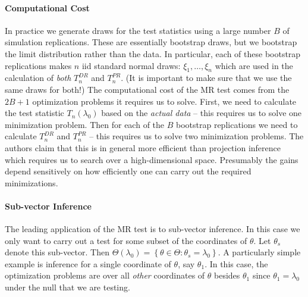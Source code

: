 \documentclass[12pt]{article}
\begin{document}
\paragraph{Computational Cost}
In practice we generate draws for the test statistics using a large number $B$ of simulation replications.
These are essentially bootstrap draws, but we bootstrap the limit distribution rather than the data.
In particular, each of these bootstrap replications makes $n$ iid standard normal draws: $\xi_1, \hdots, \xi_n$ which are used in the calculation of \emph{both} $T_n^{DR}$ and $T_n^{PR}$.
(It is important to make sure that we use the same draws for both!)
The computational cost of the MR test comes from the $2B +1$ optimization problems it requires us to solve.
First, we need to calculate the test statistic $T_n(\lambda_0)$ based on the \emph{actual data} -- this requires us to solve one minimization problem.
Then for each of the $B$ bootstrap replications we need to calculate $T_n^{DR}$ and $T_n^{PR}$ -- this requires us to solve two minimization problems.
The authors claim that this is in general more efficient than projection inference which requires us to search over a high-dimensional space.
Presumably the gains depend sensitively on how efficiently one can carry out the required minimizations.


\paragraph{Sub-vector Inference}
The leading application of the MR test is to sub-vector inference.
In this case we only want to carry out a test for some subset of the coordinates of $\theta$.
Let $\theta_s$ denote this sub-vector.
Then $\Theta(\lambda_0) = \left\{ \theta\in \Theta \colon \theta_s = \lambda_0 \right\}$. 
A particularly simple example is inference for a single coordinate of $\theta$, say $\theta_1$.
In this case, the optimization problems are over all \emph{other} coordinates of $\theta$ besides $\theta_1$ since $\theta_1 = \lambda_0$ under the null that we are testing.
\end{document}

